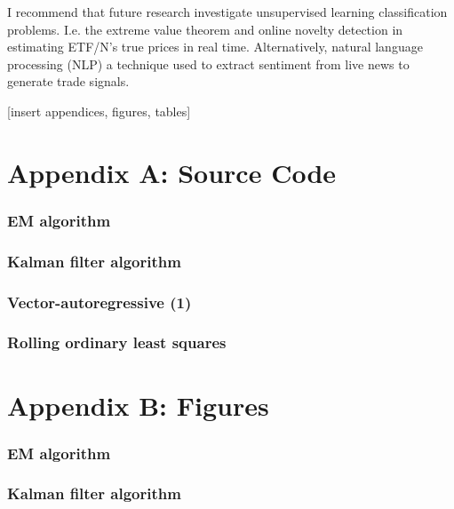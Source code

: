 \documentclass[12pt, letterpaper]{article}
\begin{document}
	
	I recommend that future research investigate unsupervised learning classification problems. I.e. the extreme value theorem and online novelty detection in estimating ETF/N's true prices in real time. Alternatively, natural language processing (NLP) a technique used to extract sentiment from live news to generate trade signals.
	
	[insert appendices, figures, tables]
	
	
	
	
	
	
	\section{Appendix A: Source Code }
	\subsubsection{EM algorithm}
	\subsubsection{Kalman filter algorithm}
	\subsubsection{Vector-autoregressive (1)}
	\subsubsection{Rolling ordinary least squares}
	\section{Appendix B: Figures}
	\subsubsection{EM algorithm}
	\subsubsection{Kalman filter algorithm}
	
	
	

	
\end{document}
